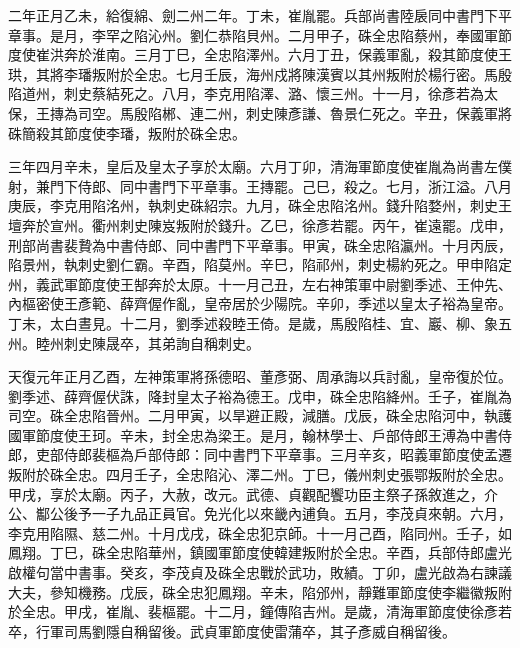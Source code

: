 \begin{pinyinscope}
 二年正月乙未，給復綿、劍二州二年。丁未，崔胤罷。兵部尚書陸扆同中書門下平章事。是月，李罕之陷沁州。劉仁恭陷貝州。二月甲子，硃全忠陷蔡州，奉國軍節度使崔洪奔於淮南。三月丁巳，全忠陷澤州。六月丁丑，保義軍亂，殺其節度使王珙，其將李璠叛附於全忠。七月壬辰，海州戍將陳漢賓以其州叛附於楊行密。馬殷陷道州，刺史蔡結死之。八月，李克用陷澤、潞、懷三州。十一月，徐彥若為太保，王摶為司空。馬殷陷郴、連二州，刺史陳彥謙、魯景仁死之。辛丑，保義軍將硃簡殺其節度使李璠，叛附於硃全忠。



 三年四月辛未，皇后及皇太子享於太廟。六月丁卯，清海軍節度使崔胤為尚書左僕射，兼門下侍郎、同中書門下平章事。王摶罷。己巳，殺之。七月，浙江溢。八月庚辰，李克用陷洺州，執刺史硃紹宗。九月，硃全忠陷洺州。錢升陷婺州，刺史王壇奔於宣州。衢州刺史陳岌叛附於錢升。乙巳，徐彥若罷。丙午，崔遠罷。戊申，刑部尚書裴贄為中書侍郎、同中書門下平章事。甲寅，硃全忠陷瀛州。十月丙辰，陷景州，執刺史劉仁霸。辛酉，陷莫州。辛巳，陷祁州，刺史楊約死之。甲申陷定州，義武軍節度使王郜奔於太原。十一月己丑，左右神策軍中尉劉季述、王仲先、內樞密使王彥範、薛齊偓作亂，皇帝居於少陽院。辛卯，季述以皇太子裕為皇帝。丁未，太白晝見。十二月，劉季述殺睦王倚。是歲，馬殷陷桂、宜、巖、柳、象五州。睦州刺史陳晟卒，其弟詢自稱刺史。



 天復元年正月乙酉，左神策軍將孫德昭、董彥弼、周承誨以兵討亂，皇帝復於位。劉季述、薛齊偓伏誅，降封皇太子裕為德王。戊申，硃全忠陷絳州。壬子，崔胤為司空。硃全忠陷晉州。二月甲寅，以旱避正殿，減膳。戊辰，硃全忠陷河中，執護國軍節度使王珂。辛未，封全忠為梁王。是月，翰林學士、戶部侍郎王溥為中書侍郎，吏部侍郎裴樞為戶部侍郎：同中書門下平章事。三月辛亥，昭義軍節度使孟遷叛附於硃全忠。四月壬子，全忠陷沁、澤二州。丁巳，儀州刺史張鄂叛附於全忠。甲戌，享於太廟。丙子，大赦，改元。武德、貞觀配饗功臣主祭子孫敘進之，介公、酅公後予一子九品正員官。免光化以來畿內逋負。五月，李茂貞來朝。六月，李克用陷隰、慈二州。十月戊戌，硃全忠犯京師。十一月己酉，陷同州。壬子，如鳳翔。丁巳，硃全忠陷華州，鎮國軍節度使韓建叛附於全忠。辛酉，兵部侍郎盧光啟權句當中書事。癸亥，李茂貞及硃全忠戰於武功，敗績。丁卯，盧光啟為右諫議大夫，參知機務。戊辰，硃全忠犯鳳翔。辛未，陷邠州，靜難軍節度使李繼徽叛附於全忠。甲戌，崔胤、裴樞罷。十二月，鐘傳陷吉州。是歲，清海軍節度使徐彥若卒，行軍司馬劉隱自稱留後。武貞軍節度使雷蒲卒，其子彥威自稱留後。




\end{pinyinscope}
